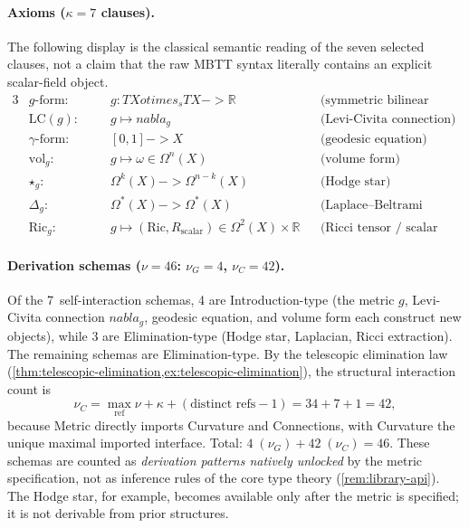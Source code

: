 \documentclass[11pt,a4paper]{article}
\def\to{->}%
\def\otimes{otimes}%
\def\nabla{nabla}%
\theoremstyle{plain}
\theoremstyle{definition}
\theoremstyle{remark}
\newcommand{\R}{\mathbb{R}}
\begin{document}
\paragraph{Axioms ($\kappa = 7$ clauses).}
The following display is the classical semantic reading of the seven selected clauses, not a claim that the raw MBTT syntax literally contains an explicit scalar-field object.
\begin{alignat*}{3}
    &g\text{-form:}           &\quad& g : TX \otimes_s TX \to \R
        && \text{(symmetric bilinear form)} \\
    &\mathrm{LC}(g)\text{:}  && g \mapsto \nabla_g
        && \text{(Levi-Civita connection)} \\
    &\gamma\text{-form:}     && [0,1] \to X
        && \text{(geodesic equation)} \\
    &\mathrm{vol}_g\text{:}  && g \mapsto \omega \in \Omega^n(X)
        && \text{(volume form)} \\
    &\star_g\text{:}          && \Omega^k(X) \to \Omega^{n-k}(X)
        && \text{(Hodge star)} \\
    &\Delta_g\text{:}         && \Omega^*(X) \to \Omega^*(X)
        && \text{(Laplace--Beltrami operator)} \\
    &\mathrm{Ric}_g\text{:}  && g \mapsto (\mathrm{Ric}, R_{\mathrm{scalar}}) \in \Omega^2(X) \times \R
        && \text{(Ricci tensor / scalar curvature)}
\end{alignat*}

\paragraph{Derivation schemas ($\nu = 46$: $\nu_G = 4$, $\nu_C = 42$).}
Of the 7~self-interaction schemas, 4 are Introduction-type (the metric $g$, Levi-Civita connection $\nabla_g$, geodesic equation, and volume form each construct new objects), while 3 are Elimination-type (Hodge star, Laplacian, Ricci extraction).
The remaining schemas are Elimination-type.
By the telescopic elimination law (\cref{thm:telescopic-elimination,ex:telescopic-elimination}), the structural interaction count is
\[
  \nu_C
  =
  \max_{\mathrm{ref}} \nu + \kappa + (\text{distinct refs} - 1)
  =
  34 + 7 + 1
  =
  42,
\]
because Metric directly imports Curvature and Connections, with Curvature the unique maximal imported interface.
Total: $4\;(\nu_G) + 42\;(\nu_C) = 46$.
These schemas are counted as \emph{derivation patterns natively unlocked} by the metric specification, not as inference rules of the core type theory (\cref{rem:library-api}).
The Hodge star, for example, becomes available only after the metric is specified; it is not derivable from prior structures.
\end{document}

